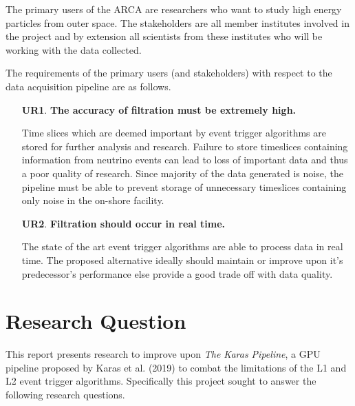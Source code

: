 The primary users of the ARCA are researchers who want to study high energy
particles from outer space. The stakeholders are all member institutes involved
in the project and by extension all scientists from these institutes who will
be working with the data collected.

The requirements of the primary users (and stakeholders) with respect to the
data acquisition pipeline are as follows.

\begin{enumerate}
  \item[\textbf{UR1}.]\textbf{The accuracy of filtration must be extremely high.}

    Time slices which are deemed important by event trigger algorithms
    are stored for further analysis and research. Failure to store
    timeslices containing information from neutrino events can lead to
    loss of important data and thus a poor quality of research. Since
    majority of the data generated is noise, the pipeline must be able
    to prevent storage of unnecessary timeslices containing only noise
    in the on-shore facility.

  \item[\textbf{UR2}.] \textbf{Filtration should occur in real time.}

    The state of the art event trigger algorithms are able to process
    data in real time. The proposed alternative ideally should
    maintain or improve upon it's predecessor's performance else
    provide a good trade off with data quality.

\end{enumerate}

\section{Research Question}
\label{sec:rqs}

This report presents research to improve upon \emph{The Karas
Pipeline}, a GPU pipeline proposed by Karas et al. (2019) to combat
the limitations of the L1 and L2 event trigger algorithms.
Specifically this project sought to answer the following research
questions.

